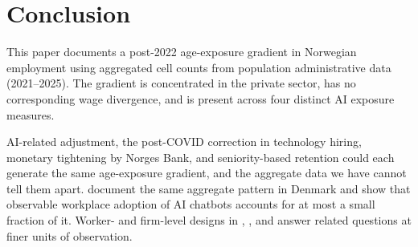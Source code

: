 \section{Conclusion}
\label{sec:conclusion}

This paper documents a post-2022 age-exposure gradient in Norwegian employment using aggregated cell counts from population administrative data (2021--2025). The gradient is concentrated in the private sector, has no corresponding wage divergence, and is present across four distinct AI exposure measures.

AI-related adjustment, the post-COVID correction in technology hiring, monetary tightening by Norges Bank, and seniority-based retention could each generate the same age-exposure gradient, and the aggregate data we have cannot tell them apart. \citet{humlum2026} document the same aggregate pattern in Denmark and show that observable workplace adoption of AI chatbots accounts for at most a small fraction of it. Worker- and firm-level designs in \citet{brynjolfsson2025}, \citet{lodefalk2026}, and \citet{humlum2026} answer related questions at finer units of observation.
